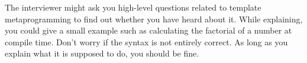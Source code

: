 The interviewer might ask you high-level questions related to template metaprogramming to find out whether you have heard about it. While explaining, you could give a small example such as calculating the factorial of a number at compile time. Don’t worry if the syntax is not entirely correct. As long as you explain what it is supposed to do, you should be fine.









